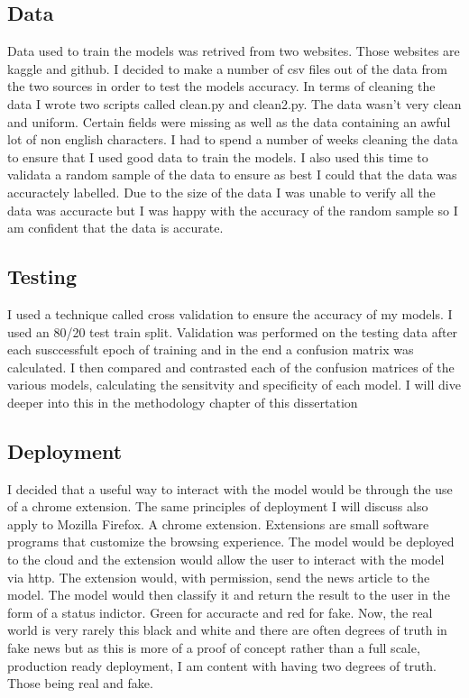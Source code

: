 \subsection{Data}
Data used to train the models was retrived from two websites. Those websites are kaggle and github. I decided to make a number of csv files out of the data from the two sources in order to test the models accuracy. In terms of cleaning the data I wrote two scripts called clean.py and clean2.py. The data wasn't very clean and uniform. Certain fields were missing as well as the data containing an awful lot of non english characters. I had to spend a number of weeks cleaning the data to ensure that I used good data to train the models. I also used this time to validata a random sample of the data to ensure as best I could that the data was accuractely labelled. Due to the size of the data I was unable to verify all the data was accuracte but I was happy with the accuracy of the random sample so I am confident that the data is accurate.
\subsection{Testing}
I used a technique called cross validation to ensure the accuracy of my models. I used an 80/20 test train split. Validation was performed on the testing data after each susccessfult epoch of training and in the end a confusion matrix was calculated. I then compared and contrasted each of the confusion matrices of the various models, calculating the sensitvity and specificity of each model. I will dive deeper into this in the methodology chapter of this dissertation

\subsection{Deployment}
I decided that a useful way to interact with the model would be through the use of a chrome extension. The same principles of deployment I will discuss also apply to Mozilla Firefox. A chrome extension. Extensions are small software programs that customize the browsing experience. The model would be deployed to the cloud and the extension would allow the user to interact with the model via http. The extension would, with permission, send the news article to the model. The model would then classify it and return the result to the user in the form of a status indictor. Green for accuracte and red for fake. Now, the real world is very rarely this black and white and there are often degrees of truth in fake news but as this is more of a proof of concept rather than a full scale, production ready deployment, I am content with having two degrees of truth. Those being real and fake. 